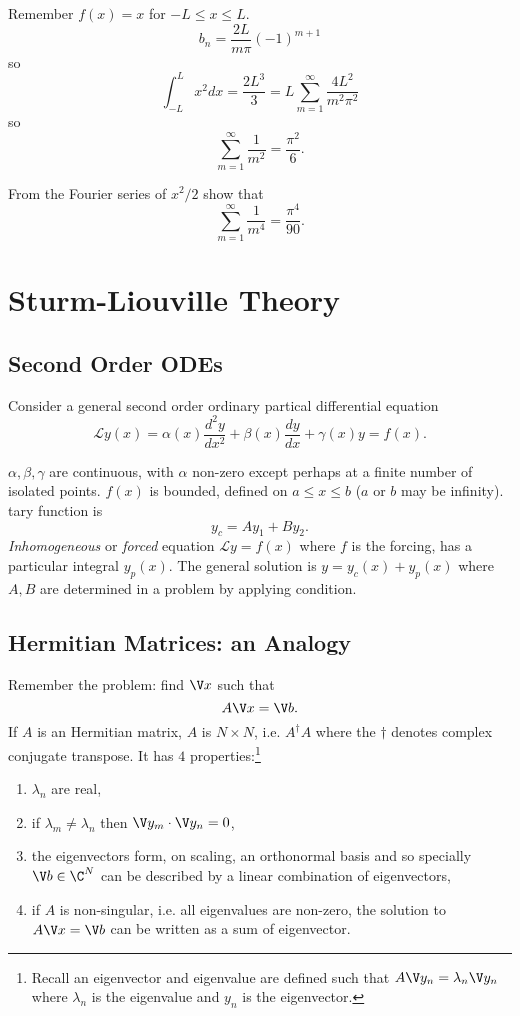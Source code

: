 \documentclass[a4paper]{article}
\renewcommand*\L{\mathcal{L}}
\begin{document}
\begin{eg}
  Remember \(f(x)=x\) for \(-L\leq x\leq L\).
  \[
    b_n = \frac{2L}{m\pi}(-1)^{m+1}
  \]
  so
  \[
    \int_{-L}^{L} x^2 dx = \frac{2L^3}{3} = L \sum_{m=1}^{\infty}\frac{4L^2}{m^2\pi^2}
  \]
  so
  \[
    \sum_{m=1}^{\infty}\frac{1}{m^2} = \frac{\pi^2}{6}.
  \]
\end{eg}

\begin{ex}
  From the Fourier series of \(x^2/2\) show that
  \[
    \sum_{m=1}^{\infty}\frac{1}{m^4} = \frac{\pi^4}{90}.
  \]
\end{ex}

\section{Sturm-Liouville Theory}

\subsection{Second Order ODEs}

Consider a general second order ordinary partical differential equation
\[
  \L y(x) = \alpha(x) \frac{d^2y}{dx^2} + \beta(x) \frac{dy}{dx} + \gamma(x) y = f(x).
\]

\(\alpha,\beta,\gamma\) are continuous, with \(\alpha\) non-zero except perhaps at a finite number of isolated points. \(f(x)\) is bounded, defined on \(a\leq x\leq b\) (\(a\) or \(b\) may be infinity).
tary function is \[
  y_c=Ay_1+By_2.
\]
\emph{Inhomogeneous} or \emph{forced} equation \(\L y = f(x)\) where \(f\) is the forcing, has a particular integral \(y_p(x)\). The general solution is \(y=y_c(x)+y_p(x)\) where \(A,B\) are determined in a problem by applying condition.

\subsection{Hermitian Matrices: an Analogy}

Remember the problem: find \(\V x \) such that
\[
A \V x = \V b.
\]
If \(A\) is an Hermitian matrix, \(A\) is \(N \times N\), i.e. \(A^\dag A\) where the \(\dag\) denotes complex conjugate transpose. It has \(4\) properties:\footnote{Recall an eigenvector and eigenvalue are defined such that \(A \V y_n = \lambda_n \V y_n\) where \(\lambda_n\) is the eigenvalue and \(y_n\) is the eigenvector.}
\begin{enumerate}
\item \(\lambda_n\) are real,
\item if \(\lambda_m\neq\lambda_n\) then \(\V y_m\cdot\V y_n=0\),
\item the eigenvectors form, on scaling, an orthonormal basis and so specially \(\V b \in \C^N\) can be described by a linear combination of eigenvectors,
\item if \(A\) is non-singular, i.e. all eigenvalues are non-zero, the solution to \(A\V x = \V b\) can be written as a sum of eigenvector.
\end{enumerate}
\end{document}
